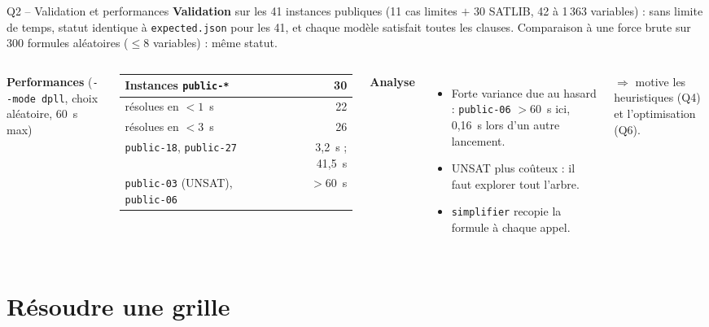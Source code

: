 \documentclass[aspectratio=169,11pt]{beamer}
\begin{document}
\begin{frame}{Q2 -- Validation et performances}
  \textbf{Validation} sur les 41 instances publiques (11 cas limites $+$ 30 SATLIB, 42 à 1\,363 variables) :
  sans limite de temps, statut identique à \texttt{expected.json} pour les 41, et chaque modèle satisfait toutes les clauses.
  Comparaison à une force brute sur 300 formules aléatoires ($\le 8$ variables) : même statut.
  \bigskip

  \begin{columns}[T]
    \textbf{Performances} {\footnotesize (\texttt{-{}-mode dpll}, choix aléatoire, 60~s max)}
    \smallskip

    {\small\begin{tabular}{@{}lr@{}}
      \toprule
      Instances \texttt{public-*} & 30 \\
      \midrule
      résolues en $< 1$~s & 22 \\
      résolues en $< 3$~s & 26 \\
      \texttt{public-18}, \texttt{public-27} & 3,2~s ; 41,5~s \\
      \texttt{public-03} (UNSAT), \texttt{public-06} & $> 60$~s \\
      \bottomrule
    \end{tabular}}
    \textbf{Analyse}
    \begin{itemize}\small
      \item Forte variance due au hasard : \texttt{public-06} $> 60$~s ici, 0,16~s lors d'un autre lancement.
      \item UNSAT plus coûteux : il faut explorer tout l'arbre.
      \item \texttt{simplifier} recopie la formule à chaque appel.
    \end{itemize}
    {\footnotesize $\Rightarrow$ motive les heuristiques (Q4) et l'optimisation (Q6).\par}
  \end{columns}
\end{frame}

\section{Résoudre une grille}
\end{document}
